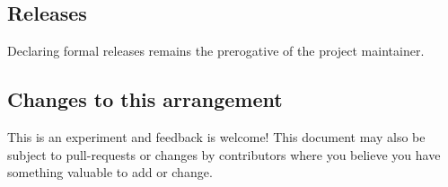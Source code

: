 \subsection*{Releases}

Declaring formal releases remains the prerogative of the project maintainer.

\subsection*{Changes to this arrangement}

This is an experiment and feedback is welcome! This document may also be subject to pull-\/requests or changes by contributors where you believe you have something valuable to add or change. 

 